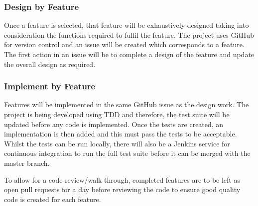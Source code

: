 \subsubsection{Design by Feature}
Once a feature is selected, that feature will be exhaustively designed taking into consideration the functions required to fulfil the feature. The project uses GitHub for version control and an issue will be created which corresponds to a feature. The first action in an issue will be to complete a design of the feature and update the overall design as required.

\subsubsection{Implement by Feature}
Features will be implemented in the same GitHub issue as the design work. The project is being developed using TDD and therefore, the test suite will be updated before any code is implemented. Once the tests are created, an implementation is then added and this must pass the tests to be acceptable. Whilst the tests can be run locally, there will also be a Jenkins service for continuous integration to run the full test suite before it can be merged with the master branch.  

To allow for a code review/walk through, completed features are to be left as open pull requests for a day before reviewing the code to ensure good quality code is created for each feature.